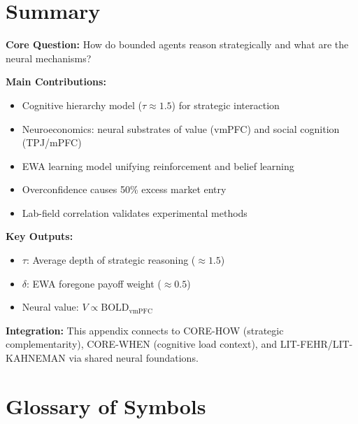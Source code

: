 \section{Summary}
\label{sec:ca-summary}

\begin{tcolorbox}[colback=green!10!white, colframe=green!75!black,
    title=\textbf{Appendix UNMAPPED_CA: Summary}]

\textbf{Core Question:} How do bounded agents reason strategically and what are the neural mechanisms?

\textbf{Main Contributions:}
\begin{itemize}[nosep]
    \item Cognitive hierarchy model ($\tau \approx 1.5$) for strategic interaction
    \item Neuroeconomics: neural substrates of value (vmPFC) and social cognition (TPJ/mPFC)
    \item EWA learning model unifying reinforcement and belief learning
    \item Overconfidence causes 50\% excess market entry
    \item Lab-field correlation validates experimental methods
\end{itemize}

\textbf{Key Outputs:}
\begin{itemize}[nosep]
    \item $\tau$: Average depth of strategic reasoning ($\approx 1.5$)
    \item $\delta$: EWA foregone payoff weight ($\approx 0.5$)
    \item Neural value: $V \propto \text{BOLD}_{\text{vmPFC}}$
\end{itemize}

\textbf{Integration:} This appendix connects to CORE-HOW (strategic complementarity),
CORE-WHEN (cognitive load context), and LIT-FEHR/LIT-KAHNEMAN via shared neural foundations.

\end{tcolorbox}


\section{Glossary of Symbols}
\label{sec:ca-glossary}

